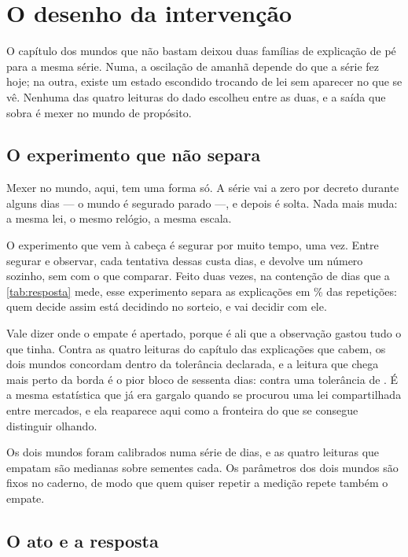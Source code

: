 \chapter{O desenho da intervenção}\label{cap:desenho}

O capítulo dos mundos que não bastam deixou duas famílias de explicação de pé para a mesma série. Numa, a oscilação de amanhã
depende do que a série fez hoje; na outra, existe um estado escondido trocando de lei sem aparecer
no que se vê. Nenhuma das quatro leituras do dado escolheu entre as duas, e a saída que sobra é
mexer no mundo de propósito.

\section{O experimento que não separa}

Mexer no mundo, aqui, tem uma forma só. A série vai a zero por decreto durante alguns dias --- o
mundo é segurado parado ---, e depois é solta. Nada mais muda: a mesma lei, o mesmo relógio, a
mesma escala.

O experimento que vem à cabeça é segurar por muito tempo, uma vez. Entre segurar e observar, cada
tentativa dessas custa \numDesenhoDiasPorReplicataMaior{} dias, e devolve um número sozinho, sem
com o que comparar. Feito duas vezes, na contenção de \numDesenhoApertadoContensao{} dias que a
\cref{tab:resposta} mede, esse experimento separa as explicações em \numDesenhoSeparaPoucasPct\%
das repetições: quem decide assim está decidindo no sorteio, e vai decidir com ele.

Vale dizer onde o empate é apertado, porque é ali que a observação gastou tudo o que tinha. Contra
as quatro leituras do capítulo das explicações que cabem, os dois mundos concordam dentro da
tolerância declarada, e
a leitura que chega mais perto da borda é o pior bloco de sessenta dias:
\numDesenhoEmpatePiorDiferenca{} contra uma tolerância de \numDesenhoEmpateToleranciaPior{}. É a
mesma estatística que já era gargalo quando se procurou uma lei compartilhada entre mercados, e ela
reaparece aqui como a fronteira do que se consegue distinguir olhando.

Os dois mundos foram calibrados numa série de \numDesenhoDiasSerie{} dias, e as quatro leituras que
empatam são medianas sobre \numDesenhoSementesEmpate{} sementes cada. Os parâmetros dos dois mundos
são fixos no caderno, de modo que quem quiser repetir a medição repete também o empate.

\section{O ato e a resposta}

